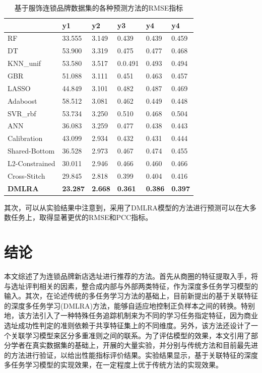 \documentclass{llncs}
\begin{document}
\begin{table}[!hpt]
	\centering
	\caption{基于服饰连锁品牌数据集的各种预测方法的RMSE指标}
	\label{tb:RMSEfushi}
	\begin{tabular}{p{3cm}<{\centering}p{1.6cm}<{\centering}p{1.6cm}<{\centering}p{1.6cm}<{\centering}p{1.6cm}<{\centering}p{1.6cm}<{\centering}}
		\hline
		& \textbf{y1} & \textbf{y2} & \textbf{y3} & \textbf{y4} & \textbf{y4} \\ \hline
		RF & 33.555 & 3.149 & 0.439 & 0.439 & 0.459 \\ %
		DT & 53.900 & 3.319 & 0.475 & 0.477 & 0.468 \\ %
		KNN\_unif & 53.580 & 3.517 & 0.0.491 & 0.493 & 0.494 \\ %
		GBR & 51.088 & 3.111 & 0.451 & 0.463 & 0.457 \\ %
		LASSO & 44.849 & 3.101 & 0.482 & 0.487 & 0.469 \\ %
		Adaboost & 58.512 & 3.081 & 0.462 & 0.449 & 0.448 \\ %
		SVR\_rbf & 53.734 & 3.250 & 0.510 & 0.468 & 0.504 \\ %
		ANN & 36.083 & 3.259 & 0.477 & 0.438 & 0.443 \\ \hline
		Calibration & 43.099 & 2.934 & 0.432 & 0.431 & 0.444 \\ %
		Shared-Bottom & 36.528 & 2.973 & 0.467 & 0.474 & 0.455 \\ %
		L2-Constrained & 30.011 & 2.946 & 0.466 & 0.460 & 0.466 \\ %
		Cross-Stitch & 29.845 & 2.818 & 0.399 & 0.404 & 0.416 \\ \hline
		\textbf{DMLRA} & \textbf{23.287} & \textbf{2.668} & \textbf{0.361} & \textbf{0.386} & \textbf{0.397}                 \\ \hline
	\end{tabular}
\end{table}

其次，可以从实验结果中注意到，采用了DMLRA模型的方法进行预测可以在大多数任务上，取得显著更优的RMSE和PCC指标。


\section{结论}
本文综述了为连锁品牌新店选址进行推荐的方法。首先从商圈的特征提取入手，将与选址评判相关的因素，整合成内部与外部两类特征，作为深度多任务学习模型的输入。其次，在论述传统的多任务学习方法的基础上，目前新提出的基于关联特征的深度多任务学习(DMLRA)方法，能够自适应地控制正负样本之间的转换。特别地，该方法引入了一种特殊任务追踪机制来为不同的学习任务指定特征，因为商业选址成功性判定的准则依赖于共享特征集上的不同维度。另外，该方法还设计了一个关联学习模型来区分多重准则之间的联系。为了评估模型的效果，本文引用了部分学者在真实数据集的基础上，开展的大量实验，并分别与传统方法和目前最先进的方法进行验证，以给出性能指标评价结果。实验结果显示，基于关联特征的深度多任务学习模型的实现效果，在一定程度上优于传统方法的实现效果。
\end{document}

